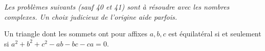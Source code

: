 \emph{Les problèmes suivants (sauf 40 et 41) sont à résoudre avec les nombres complexes. Un choix judicieux de l'origine aide parfois.}

Un triangle dont les sommets ont pour affixes $a, b, c$ est équilatéral si et seulement si $a^2 + b^2 + c^2 - ab - bc - ca = 0$.
